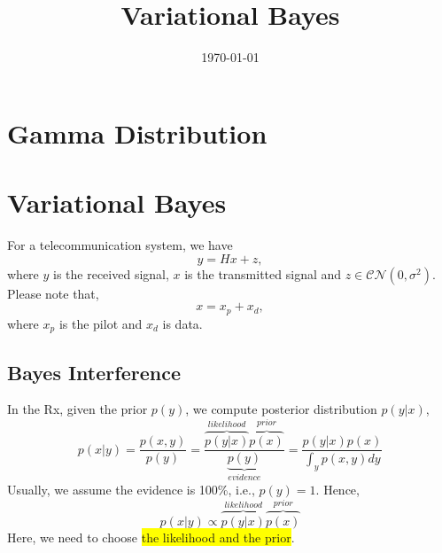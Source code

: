 \documentclass{article}
\title{
	\Huge \textbf{Variational Bayes} \\[1em]
}
\author{\qxw}
\date{\today}
\begin{document}

\maketitle

\newpage
\tableofcontents
\newpage

\section{Gamma Distribution}


\section{Variational Bayes}
For a telecommunication system, we have
\begin{equation}
y = Hx + z,
\end{equation}
where $y$ is the received signal, $x$ is the transmitted signal and $z\in \mathcal{CN}(0, \sigma^2)$. Please note that, 
\begin{equation}
x = x_p + x_d,
\end{equation}
where $x_p$ is the pilot and $x_d$ is data.
\subsection{Bayes Interference}
In the Rx, given the prior $p(y)$, we compute posterior distribution $p(y|x)$,
\begin{equation}
p(x|y) = \frac{p(x,y)}{p(y)} = \frac{\overbrace{p(y|x)}^{likelihood}\overbrace{p(x)}^{prior}}{\underbrace{p(y)}_{evidence}} = \frac{p(y|x)p(x)}{\int_y p(x,y)dy}
\end{equation}
Usually, we assume the evidence is 100\%, i.e., $p(y)=1$. Hence,
\begin{equation}
p(x|y) \propto \overbrace{p(y|x)}^{likelihood}\overbrace{p(x)}^{prior}
\end{equation}
Here, we need to choose \colorbox{yellow}{the likelihood and the prior}.
\end{document}

